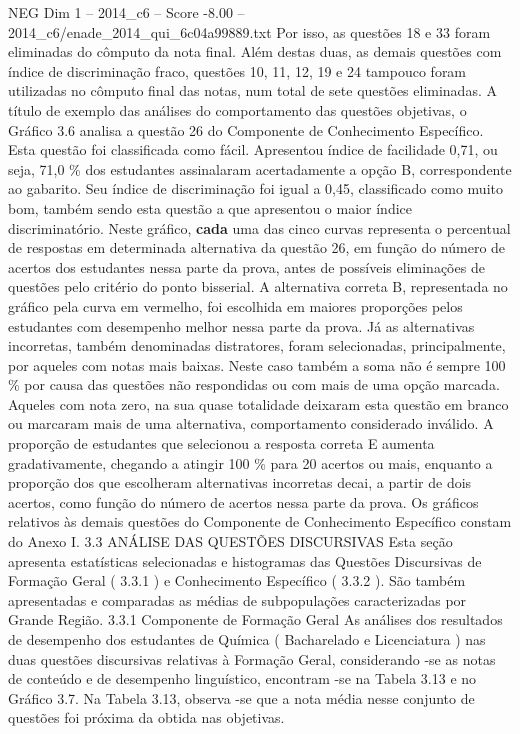 \begin{textsample}{NEG Dim 1 – 2014\_c6 – Score -8.00 – 2014\_c6/enade\_2014\_qui\_6c04a99889.txt}
Por isso, as questões 18 e 33 foram eliminadas do cômputo da nota final.
Além destas duas, as demais questões com índice de discriminação fraco, questões 10, 11, 12, 19 e 24 tampouco foram utilizadas no cômputo final das notas, num total de sete questões eliminadas.
A título de exemplo das análises do comportamento das questões objetivas, o Gráfico 3.6 analisa a questão 26 do Componente de Conhecimento Específico.
Esta questão foi classificada como fácil.
Apresentou índice de facilidade 0,71, ou seja, 71,0 \% dos estudantes assinalaram acertadamente a opção B, correspondente ao gabarito.
Seu índice de discriminação foi igual a 0,45, classificado como muito bom, também sendo esta questão a que apresentou o maior índice discriminatório.
Neste gráfico, \textbf{cada} uma das cinco curvas representa o percentual de respostas em determinada alternativa da questão 26, em função do número de acertos dos estudantes nessa parte da prova, antes de possíveis eliminações de questões pelo critério do ponto bisserial.
A alternativa correta B, representada no gráfico pela curva em vermelho, foi escolhida em maiores proporções pelos estudantes com desempenho melhor nessa parte da prova.
Já as alternativas incorretas, também denominadas distratores, foram selecionadas, principalmente, por aqueles com notas mais baixas.
Neste caso também a soma não é sempre 100 \% por causa das questões não respondidas ou com mais de uma opção marcada.
Aqueles com nota zero, na sua quase totalidade deixaram esta questão em branco ou marcaram mais de uma alternativa, comportamento considerado inválido.
A proporção de estudantes que selecionou a resposta correta E aumenta gradativamente, chegando a atingir 100 \% para 20 acertos ou mais, enquanto a proporção dos que escolheram alternativas incorretas decai, a partir de dois acertos, como função do número de acertos nessa parte da prova.
Os gráficos relativos às demais questões do Componente de Conhecimento Específico constam do Anexo I. 3.3 ANÁLISE DAS QUESTÕES DISCURSIVAS Esta seção apresenta estatísticas selecionadas e histogramas das Questões Discursivas de Formação Geral ( 3.3.1 ) e Conhecimento Específico ( 3.3.2 ).
São também apresentadas e comparadas as médias de subpopulações caracterizadas por Grande Região. 3.3.1 Componente de Formação Geral As análises dos resultados de desempenho dos estudantes de Química ( Bacharelado e Licenciatura ) nas duas questões discursivas relativas à Formação Geral, considerando -se as notas de conteúdo e de desempenho linguístico, encontram -se na Tabela 3.13 e no Gráfico 3.7.
Na Tabela 3.13, observa -se que a nota média nesse conjunto de questões foi próxima da obtida nas objetivas.

\end{textsample}
